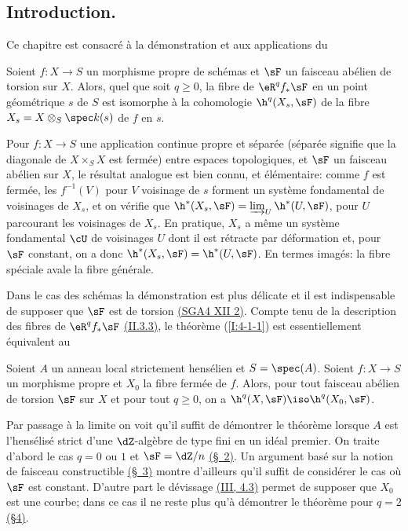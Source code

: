 \subsection{Introduction.}\label{I:4-1}

Ce chapitre est consacré à la démonstration et aux applications du 





\begin{theoremdotdash}\label{I:4-1-1}
Soient $f:X\to S$ un morphisme propre de schémas et $\sF$ un faisceau abélien 
de torsion sur $X$. Alors, quel que soit $q\geqslant 0$, la fibre de 
$\eR^q f_* \sF$ en un point géométrique $s$ de $S$ est isomorphe à la 
cohomologie $\h^q(X_s,\sF)$ de la fibre $X_s=X\otimes_S \spec k(s)$ de $f$ en 
$s$. 
\end{theoremdotdash}

Pour $f:X\to S$ une application continue propre et séparée (séparée 
signifie que la diagonale de $X\times_S X$ est fermée) entre espaces 
topologiques, et $\sF$ un faisceau abélien sur $X$, le résultat analogue est 
bien connu, et élémentaire: comme $f$ est fermée, les $f^{-1}(V)$ pour 
$V$ voisinage de $s$ forment un système fondamental de voisinages de $X_s$, et 
on vérifie que $\h^*(X_s,\sF) = \varinjlim_U \h^*(U,\sF)$, pour $U$ parcourant les 
voisinages de $X_s$. En pratique, $X_s$ a même un système fondamental 
$\cU$ de voisinages $U$ dont il est rétracte par déformation et, pour $\sF$ 
constant, on a donc $\h^*(X_s,\sF)=\h^*(U,\sF)$. En termes imagés: la fibre 
spéciale avale la fibre générale. 

Dans le cas des schémas la démonstration est plus délicate et il est 
indispensable de supposer que $\sF$ est de torsion \hyperlink{cite.sga4}{(SGA4 XII 2)}. Compte 
tenu de la description des fibres de $\eR^q f_* \sF$ \hyperref[I:2-3-3]{(II.3.3)}, le théorème 
(\ref{I:4-1-1}) est essentiellement équivalent au 

 
  
   
    
\begin{theoremdotdash}\label{I:4-1-2}
Soient $A$ un anneau local strictement hensélien et $S=\spec(A)$. Soient 
$f:X\to S$ un morphisme propre et $X_0$ la fibre fermée de $f$. Alors, pour 
tout faisceau abélien de torsion $\sF$ sur $X$ et pour tout $q\geqslant 0$, on 
a $\h^q(X,\sF) \iso \h^q(X_0,\sF)$. 
\end{theoremdotdash} 

Par passage à la limite on voit qu'il suffit de démontrer le théorème 
lorsque $A$ est l'hensélisé strict d'une $\dZ$-algèbre  de type fini en 
un idéal premier. On traite d'abord le cas $q=0$ ou $1$ et $\sF=\dZ/n$ 
\hyperref[I:4-2]{(\S~2)}. Un argument basé sur la notion de faisceau constructible 
\hyperref[I:4-3]{(\S~3)} montre d'ailleurs qu'il suffit de considérer le cas où $\sF$ est 
constant. D'autre part le dévissage \hyperref[I:3-4-3]{(III, 4.3)} permet de supposer que 
$X_0$ est une courbe; dans ce cas il ne reste plus qu'à démontrer le 
théorème pour $q=2$ \hyperref[I:4-4]{(\S4)}. 


